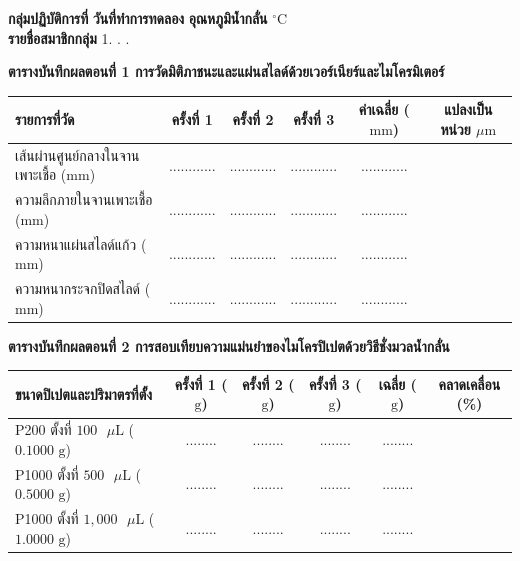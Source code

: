 \begin{worksheetbox}
\noindent\textbf{กลุ่มปฏิบัติการที่} \dotfill \textbf{วันที่ทำการทดลอง} \dotfill \textbf{อุณหภูมิน้ำกลั่น} \dotfill $^\circ\text{C}$\\[4pt]
\noindent\textbf{รายชื่อสมาชิกกลุ่ม} 1. . . \dotfill

\vspace{6pt}
\noindent\textbf{ตารางบันทึกผลตอนที่ 1 การวัดมิติภาชนะและแผ่นสไลด์ด้วยเวอร์เนียร์และไมโครมิเตอร์}
\begin{center}
\footnotesize\setlength{\tabcolsep}{3.5pt}
\begin{tabularx}{\linewidth}{>{\raggedright\arraybackslash}X c c c c c}
\toprule
\textbf{รายการที่วัด} & \textbf{ครั้งที่ 1} & \textbf{ครั้งที่ 2} & \textbf{ครั้งที่ 3} & \textbf{ค่าเฉลี่ย ($\text{mm}$)} & \textbf{แปลงเป็นหน่วย $\mu\text{m}$} \\
\midrule
เส้นผ่านศูนย์กลางในจานเพาะเชื้อ ($\text{mm}$) & ............ & ............ & ............ & ............ & \dotfill \\
ความลึกภายในจานเพาะเชื้อ ($\text{mm}$) & ............ & ............ & ............ & ............ & \dotfill \\
ความหนาแผ่นสไลด์แก้ว ($\text{mm}$) & ............ & ............ & ............ & ............ & \dotfill \\
ความหนากระจกปิดสไลด์ ($\text{mm}$) & ............ & ............ & ............ & ............ & \dotfill \\
\bottomrule
\end{tabularx}
\end{center}

\vspace{4pt}
\noindent\textbf{ตารางบันทึกผลตอนที่ 2 การสอบเทียบความแม่นยำของไมโครปิเปตด้วยวิธีชั่งมวลน้ำกลั่น}
\begin{center}
\footnotesize\setlength{\tabcolsep}{3.5pt}
\begin{tabularx}{\linewidth}{>{\raggedright\arraybackslash}X c c c c c}
\toprule
\textbf{ขนาดปิเปตและปริมาตรที่ตั้ง} & \textbf{ครั้งที่ 1 ($\text{g}$)} & \textbf{ครั้งที่ 2 ($\text{g}$)} & \textbf{ครั้งที่ 3 ($\text{g}$)} & \textbf{เฉลี่ย ($\text{g}$)} & \textbf{คลาดเคลื่อน (\%)} \\
\midrule
P200 ตั้งที่ $100\text{ }\mu\text{L}$ ($0.1000\text{ g}$) & ........ & ........ & ........ & ........ & \dotfill \\
P1000 ตั้งที่ $500\text{ }\mu\text{L}$ ($0.5000\text{ g}$) & ........ & ........ & ........ & ........ & \dotfill \\
P1000 ตั้งที่ $1{,}000\text{ }\mu\text{L}$ ($1.0000\text{ g}$) & ........ & ........ & ........ & ........ & \dotfill \\
\bottomrule
\end{tabularx}
\end{center}


\end{worksheetbox}
